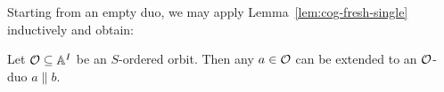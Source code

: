Starting from an empty duo, we may apply Lemma~\ref{lem:cog-fresh-single} inductively and obtain:
\begin{lemma}\label{lem:cog-fresh-full}
    Let $\cal O \subseteq \A^I$ be an $S$-ordered orbit.
    Then any $a \in \cal O$ can be extended to an ${\cal O}$-duo $a\parallel b$.
\end{lemma}

